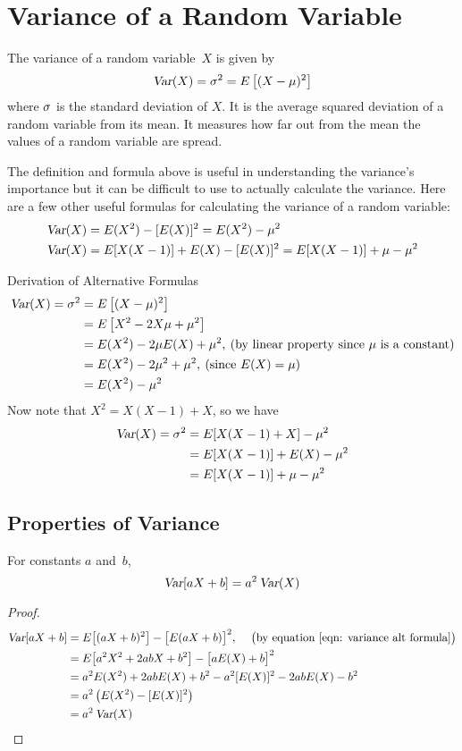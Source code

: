 \section{Variance of a Random Variable}
The variance of a random variable~$X$ is given by
\[
    \operatorname{\textsl{Var}}(X) = \sigma^2 = E\left[(X - \mu)^2\right]
\]
where $\sigma$ is the standard deviation of $X$. It is the average squared deviation of a random variable from its mean. It measures how far out from the mean the values of a random variable are spread.
\smallskip\par
The definition and formula above is useful in understanding the variance's importance but it can be difficult to use to actually calculate the variance. Here are a few other useful formulas for calculating the variance of a random variable:
\begin{align}
    \operatorname{\textsl{Var}}(X) &= E(X^2) - [E(X)]^2 = E(X^2) - \mu^2 \label{eqn: variance alt formula}\\
    \operatorname{\textsl{Var}}(X) &= E[X(X-1)] + E(X) - [E(X)]^2 = E[X(X-1)] + \mu - \mu^2
\end{align}
\begin{theory}{Derivation of Alternative Formulas}
\begin{align*}
    \operatorname{\textsl{Var}}(X) = \sigma^2 
    &= E\left[(X - \mu)^2\right] \\
    &= E\left[X^2 -2X\mu + \mu^2\right] \\
    &= E(X^2) - 2\mu E(X) + \mu^2,\:\text{(by linear property since $\mu$ is a constant)} \\
    &= E(X^2) - 2\mu^2 + \mu^2,\:\text{(since $E(X) = \mu$)} \\
    &= E(X^2) - \mu^2
\end{align*}
Now note that $X^2 = X(X-1) + X$, so we have
\begin{align*}
    \operatorname{\textsl{Var}}(X) = \sigma^2
    &= E[X(X-1) + X]  - \mu^2 \\
    &= E[X(X-1)] + E(X) -\mu^2 \\
    &= E[X(X-1)] + \mu -\mu^2
\end{align*}
\end{theory}
\subsection*{Properties of Variance}
\begin{theorem}
For constants $a$ and~$b$,
\[
    \operatorname{\textsl{Var}}[aX + b] = a^2\operatorname{\textsl{Var}}(X)
\]
\end{theorem}
\begin{proof}
\begin{align*}
    \operatorname{\textsl{Var}}[aX + b]
    &= E\bigl[(aX + b)^2\bigr] - \bigl[E(aX + b)\bigr]^2,\hspace{12pt}\text{\big (by equation \eqref{eqn: variance alt formula}\big)} \\
    &= E\bigl[a^2 X^2 + 2abX + b^2\bigr] - \bigl[aE(X) + b\bigr]^2 \\
    &= a^2 E(X^2) + 2ab E(X) + b^2 - a^2[E(X)]^2 - 2abE(X) - b^2 \\
    &= a^2 \left(E(X^2) - [E(X)]^2\right) \\
    &= a^2 \operatorname{\textsl{Var}}(X)
\end{align*}
\end{proof}
